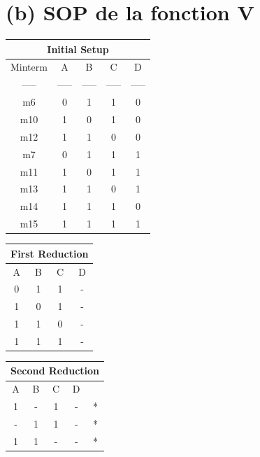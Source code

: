 \documentclass{article}
\begin{document}
\section*{(b) SOP de la fonction V}
\begin{tabular}{|c|c|c|c|c|}
    \hline
    \multicolumn{5}{|c|}{Initial Setup}     \\
    \hline
    Minterm & A     & B     & C     & D     \\
    \hline
    -----   & ----- & ----- & ----- & ----- \\
    \hline
    m6      & 0     & 1     & 1     & 0     \\
    m10     & 1     & 0     & 1     & 0     \\
    m12     & 1     & 1     & 0     & 0     \\
    \hline
    m7      & 0     & 1     & 1     & 1     \\
    m11     & 1     & 0     & 1     & 1     \\
    m13     & 1     & 1     & 0     & 1     \\
    m14     & 1     & 1     & 1     & 0     \\
    \hline
    m15     & 1     & 1     & 1     & 1     \\
    \hline
\end{tabular}
\quad
\begin{tabular}{|cccc|}
    \hline
    \multicolumn{4}{|c|}{First Reduction} \\
    \hline
    A & B & C & D                         \\
    \hline
    0 & 1 & 1 & -                         \\
    1 & 0 & 1 & -                         \\
    1 & 1 & 0 & -                         \\
    \hline
    1 & 1 & 1 & -                         \\
    \hline
\end{tabular}
\quad
\begin{tabular}{|ccccc|}
    \hline
    \multicolumn{5}{|c|}{Second Reduction} \\
    \hline
    A & B & C & D &                        \\
    \hline
    1 & - & 1 & - & *                      \\
    - & 1 & 1 & - & *                      \\
    1 & 1 & - & - & *                      \\
    \hline
\end{tabular}
\end{document}
